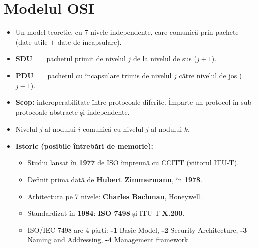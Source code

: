 \documentclass[11pt,a4paper]{article}
\begin{document}

\section{Modelul OSI}
\begin{itemize}
  \item Un model teoretic, cu 7 nivele independente, care comunică prin pachete (date utile $+$ date de încapsulare).
  \item \textbf{SDU} $=$ pachetul primit de nivelul $j$ de la nivelul de sus ($j+1$).
  \item \textbf{PDU} $=$ pachetul cu încapsulare trimis de nivelul $j$ către nivelul de jos ($j-1$).
\end{itemize}


\begin{itemize}
  \item \textbf{Scop:} interoperabilitate între protocoale diferite. Împarte un protocol în sub-protocoale abstracte și independente.
  \item Nivelul $j$ al nodului $i$ comunică cu nivelul $j$ al nodului $k$.
  \item \textbf{Istoric (posibile întrebări de memorie):}
  \begin{itemize}
    \item Studiu lansat în \textbf{1977} de ISO împreună cu CCITT (viitorul ITU-T).
    \item Definit prima dată de \textbf{Hubert Zimmermann}, în \textbf{1978}.
    \item Arhitectura pe 7 nivele: \textbf{Charles Bachman}, Honeywell.
    \item Standardizat în \textbf{1984}: \textbf{ISO 7498} și ITU-T \textbf{X.200}.
    \item ISO/IEC 7498 are 4 părți: \textbf{-1} Basic Model, \textbf{-2} Security Architecture, \textbf{-3} Naming and Addressing, \textbf{-4} Management framework.
  \end{itemize}
\end{itemize}
\end{document}
